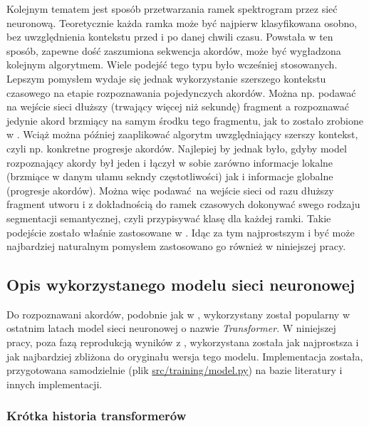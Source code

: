 Kolejnym tematem jest sposób przetwarzania ramek spektrogram przez sieć neuronową. Teoretycznie
każda ramka może być najpierw klasyfikowana osobno, bez uwzględnienia kontekstu przed i po danej
chwili czasu. Powstała w ten sposób, zapewne dość zaszumiona sekwencja akordów, może być wygładzona
kolejnym algorytmem. Wiele podejść tego typu było wcześniej stosowanych. Lepszym pomysłem wydaje się
jednak wykorzystanie szerszego kontekstu czasowego na etapie rozpoznawania pojedynczych akordów.
Można np.  podawać na wejście sieci dłuższy (trwający więcej niż sekundę) fragment a rozpoznawać
jedynie akord brzmiący na samym środku tego fragmentu, jak to zostało zrobione w
\cite{korzeniowski_fully_2016}.  Wciąż można później zaaplikować algorytm uwzględniający szerszy
kontekst, czyli np. konkretne progresje akordów. Najlepiej by jednak było, gdyby model rozpoznający
akordy był jeden i łączył w sobie zarówno informacje lokalne (brzmiące w danym ułamu sekndy
częstotliwości) jak i informacje globalne (progresje akordów). Można więc podawać na wejście sieci
od razu dłuższy fragment utworu i z dokładnością do ramek czasowych dokonywać swego rodzaju
segmentacji semantycznej, czyli przypisywać klasę dla każdej ramki. Takie podejście zostało właśnie
zastosowane w \cite{park_bi-directional_2019}. Idąc za tym najprostszym i być może najbardziej
naturalnym pomysłem zastosowano go również w niniejszej pracy. 

\subsection{Opis wykorzystanego modelu sieci neuronowej}

Do rozpoznawani akordów, podobnie jak w \cite{park_bi-directional_2019}, wykorzystany został
popularny w ostatnim latach model sieci neuronowej o nazwie \emph{Transformer}. W niniejszej pracy,
poza fazą reprodukcją wyników z \cite{park_bi-directional_2019}, wykorzystana została jak
najprostsza i jak najbardziej zbliżona do oryginału wersja tego modelu. Implementacja została,
przygotowana samodzielnie (plik \url{src/training/model.py}) na bazie literatury i innych
implementacji.

\subsubsection{Krótka historia transformerów}

